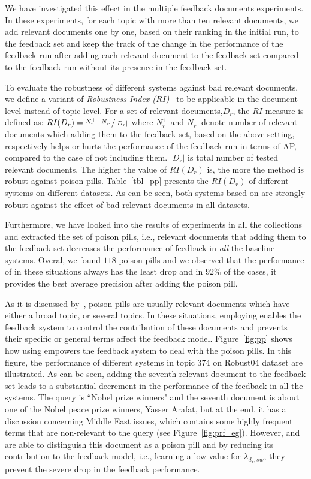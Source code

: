 We have investigated this effect in the multiple feedback documents experiments. In these experiments, for each topic with more than ten relevant documents, we add relevant documents one by one, based on their ranking in the initial run, to the feedback set and keep the track of the change in the performance of the feedback run after adding each relevant document to the feedback set compared to the feedback run without its presence in the feedback set.  
%

%

To evaluate the robustness of different systems against bad relevant documents, we define a variant of \emph{Robustness Index ($RI$)}~\citep{Collins-Thompson:2007} to be applicable in the document level instead of topic level. For a set of
relevant documents,$D_r$, the $RI$ measure is defined as: $ RI(D_r)= \nicefrac{N_r^+ -  N_r^-}{|D_r|}$ where $N_r^+$ and $N_r^-$ denote number of relevant documents which adding them to the feedback set, based on the above setting, respectively helps or hurts the performance of the feedback run in terms of AP, compared to the case of not including them. $|D_r|$ is total number of tested relevant documents. The higher the value of $RI(D_r)$ is, the more the method is robust against poison pills. Table~\ref{tbl_pp} presents the $RI(D_r)$ of different systems on different datasets. As can be seen, both systems based on \swlms  are strongly robust against the effect of bad relevant documents in all datasets. 

Furthermore, we have looked into the results of experiments in all the collections and extracted the set of poison pills, i.e., relevant documents that adding them to the feedback set decreases the  performance of feedback in \emph{all} the baseline systems. 
Overal, we found $118$ poison pills and we observed that the performance of \acrswlm  in these situations always has the least drop and in $92\%$ of the cases, it provides the best average precision after adding the poison pill. 

As it is discussed by~\citet{Terra:2005}, poison pills are usually relevant documents which have either a broad topic, or several topics. In these situations, employing \swlms  enables the feedback system to control the contribution of these documents and prevents their specific or general terms affect the feedback model. Figure~\ref{fig:pp} shows how using \swlm  empowers the feedback system to deal with the poison pills. In this figure, the performance of different systems in topic $374$ on Robust04 dataset are illustrated. As can be seen, adding the seventh relevant document to the feedback set leads to a substantial decrement in the performance of the feedback in all the systems. The query is ``Nobel prize winners" and the seventh document is about one of the Nobel peace prize winners, Yasser Arafat, but at the end, it has a discussion concerning Middle East issues, which contains some highly frequent terms that are non-relevant to the query (see Figure~\ref{fig:prf_eg}).  
However, \acrswlm  and \acswlm  are able to distinguish this document as a poison pill and by reducing its contribution to the feedback model, i.e., learning a low value for $\lambda_{d_7,sw}$, they prevent the severe drop in the feedback performance. 

